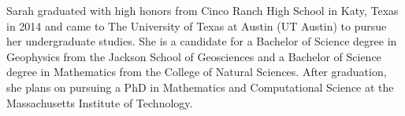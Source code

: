 Sarah graduated with high honors from Cinco Ranch High School in Katy, Texas in 2014 and came to The University of Texas at Austin (UT Austin) to pursue her undergraduate studies. She is a candidate for a Bachelor of Science degree in Geophysics from the Jackson School of Geosciences and a Bachelor of Science degree in Mathematics from the College of Natural Sciences. After graduation, she plans on pursuing a PhD in Mathematics and Computational Science at the Massachusetts Institute of Technology.
